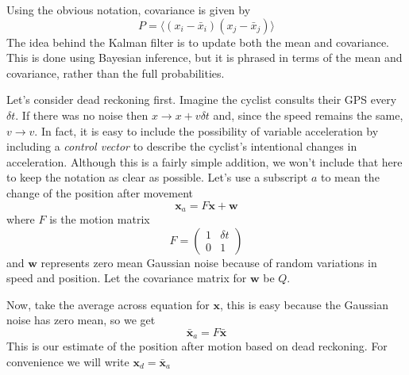 \documentclass[12pt]{article}
\begin{document}
Using the obvious notation, covariance is given by
\begin{equation}
P=\langle (x_i-\bar{x}_i)(x_j-\bar{x}_j)\rangle
\end{equation}
The idea behind the Kalman filter is to update both the mean and
covariance. This is done using Bayesian inference, but it is phrased
in terms of the mean and covariance, rather than the full
probabilities.

Let's consider dead reckoning first. Imagine the cyclist consults their
GPS every $\delta t$. If there was no noise then $x\rightarrow
x+v\delta t$ and, since the speed remains the same, 
$v\rightarrow v$. 
In fact, it is easy to include the possibility of variable
acceleration by including a \textsl{control vector} to describe the
cyclist's intentional changes in acceleration. Although this is a
fairly simple addition, we won't include that here to keep the
notation as clear as possible. Let's use a subscript $a$ to mean the
change of the position after movement
\begin{equation}
\textbf{x}_a=F\textbf{x}+\textbf{w}
\end{equation}
where $F$ is the motion matrix
\begin{equation}
F=\left(\begin{array}{cc}1&\delta t\\0&1\end{array}\right)
\end{equation}
and $\mathbf{w}$ represents zero mean Gaussian noise because of random
variations in speed and position. Let the covariance matrix for
$\mathbf{w}$ be $Q$.

Now, take the average across equation for $\mathbf{x}$, this is easy
because the Gaussian noise has zero mean, so we get
\begin{equation}
\mathbf{\bar{x}}_a=F\mathbf{\bar{x}}
\end{equation}
This is our estimate of the position after motion based on dead reckoning. For convenience we will write $\mathbf{x}_d=\mathbf{\bar{x}}_a$
\end{document}
